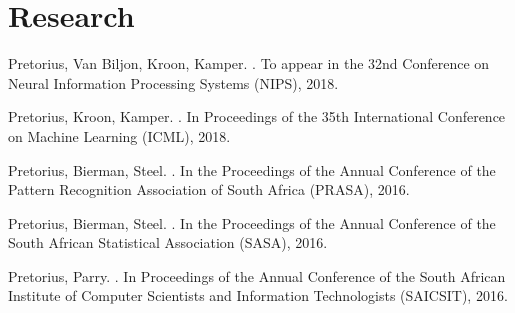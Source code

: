 \documentclass[]{deedy-resume-openfont}
\begin{document}
\begin{minipage}[t]{0.66\textwidth}


\section{Research}
\descript{}
\begin{tightemize}
\item Pretorius, Van Biljon, Kroon, Kamper. . To appear in the 32nd Conference on Neural Information Processing Systems (NIPS), 2018.
\item Pretorius, Kroon, Kamper. . In Proceedings of the 35th International Conference on Machine Learning (ICML), 2018. \href{https://arxiv.org/pdf/1806.05413.pdf}{\custombold{[link]}}
\item Pretorius, Bierman, Steel. . In the Proceedings of the Annual Conference of the Pattern Recognition Association of South Africa (PRASA), 2016. \href{http://ieeexplore.ieee.org/abstract/document/7813171/?reload=true&lipi=urn:li:page:d_flagship3_profile_view_base;I751iNLxTn%2BqB3Q6oh5vBQ%3D%3D}{\custombold{[link]}}
\item Pretorius, Bierman, Steel. . In the Proceedings of the Annual Conference of the South African Statistical Association (SASA), 2016. \href{https://journals.co.za/content/sasj_proc/2016/con-1/EJC198852?lipi=urn%3Ali%3Apage%3Ad_flagship3_profile_view_base%3BI751iNLxTn%2BqB3Q6oh5vBQ%3D%3D#abstract_content}{\custombold{[link]}}
\item Pretorius, Parry. . In Proceedings of the Annual Conference of the South African Institute of Computer Scientists and Information Technologists (SAICSIT), 2016. \href{https://dl.acm.org/citation.cfm?id=2987493&lipi=urn%253Ali%253Apage%253Ad_flagship3_profile_view_base%253BI751iNLxTn%252BqB3Q6oh5vBQ%253D%253D}{\custombold{[link]}}
\end{tightemize}
\sectionsep


\end{minipage}
\end{document}
